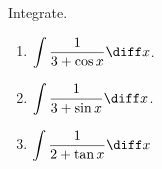 Integrate.
\begin{enumerate}
\item \label{problemInt1/(3+cos x)dx} $\displaystyle \int \frac{1}{3+\cos x}\diff x$.
\item $\displaystyle \int \frac{1}{3+\sin x}\diff x$.
\item $\displaystyle \int \frac{1}{2+\tan x}\diff x$
\end{enumerate}